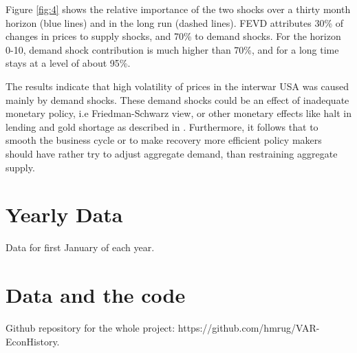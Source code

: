 \documentclass[a4paper,12pt]{article}
\begin{document}
Figure \ref{fig:4} shows the relative importance of the two shocks over a thirty month horizon (blue lines) and in the long run (dashed lines). FEVD attributes 30\% of changes in prices to supply shocks, and 70\% to demand shocks. For the horizon 0-10, demand shock contribution is much higher than 70\%, and for a long time stays at a level of about 95\%.

The results indicate that high volatility of prices in the interwar USA was caused mainly by demand shocks. These demand shocks could be an effect of inadequate monetary policy, i.e Friedman-Schwarz view, or other monetary effects like halt in lending and gold shortage as described in \cite{kindleberger1973}. Furthermore, it follows that to smooth the business cycle or to make recovery more efficient policy makers should have rather try to adjust aggregate demand, than restraining aggregate supply. 

\pagebreak

\begin{appendices}
\section{Yearly Data}

Data for first January of each year.

\begin{table}[h]
\centering

\end{table}

\section{Data and the code}

Github repository for the whole project: https://github.com/hmrug/VAR-EconHistory.

\end{appendices}

\pagebreak



\end{document}
